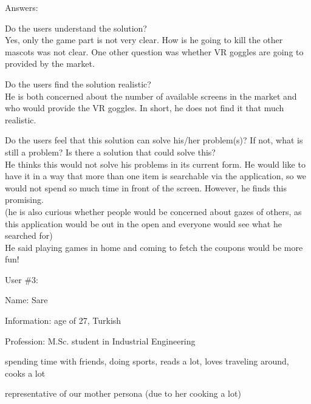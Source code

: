 \documentclass[a4paper,10pt,oneside]{scrreprt}
\begin{document}
Answers:
\begin{compactitem}
	\item Do the users understand the solution?\\
		Yes, only the game part is not very clear. How is he going to kill the other mascots was not clear. One other question was whether VR goggles are going to provided by the market.\\
	
	\item Do the users find the solution realistic?\\
	He is both concerned about the number of available screens in the market and who would provide the VR goggles. In short, he does not find it that much realistic.\\
	
	\item Do the users feel that this solution can solve his/her problem(s)? If not, what is still
	a problem? Is there a solution that could solve this?\\
		He thinks this would not solve his problems in its current form. He would like to have it in a way that more than one item is searchable via the application, so we would not spend so much time in front of the screen. However, he finds this promising.\\
		(he is also curious whether people would be concerned about gazes of others, as this application would be out in the open and everyone would see what he searched for)\\
		He said playing games in home and coming to fetch the coupons would be more fun!
\end{compactitem}
\bigskip

User \#3:
\begin{compactitem}
	\item Name: Sare
	\item Information: age of 27, Turkish
	\item Profession: M.Sc. student in Industrial Engineering
	\item spending time with friends, doing sports, reads a lot, loves traveling around, cooks a lot  
	\item representative of our mother persona (due to her cooking a lot)
\end{compactitem}
\bigskip
\end{document}
